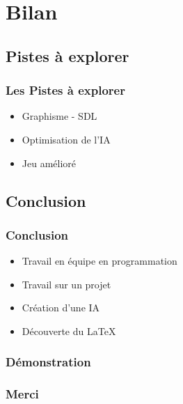 \section{Bilan}
	\subsection{Pistes à explorer}
		\frametitle{\textbf{Les Pistes à explorer}}
		\begin{frame}
			\begin{itemize}
				\item Graphisme - SDL
				\item Optimisation de l'IA
				\item Jeu amélioré
			\end{itemize}
		\end{frame}

	\subsection{Conclusion}
		\begin{frame}
			\frametitle{\textbf{Conclusion}}
			\begin{itemize}
				\item Travail en équipe en programmation
				\item Travail sur un projet
				\item Création d'une IA
				\item Découverte du LaTeX
		\end{itemize}
		\end{frame}
		
		\begin{frame}
			\frametitle{\textbf{Démonstration}}
		\end{frame}

		\begin{frame}
			\frametitle{\textbf{Merci}}
		\end{frame}